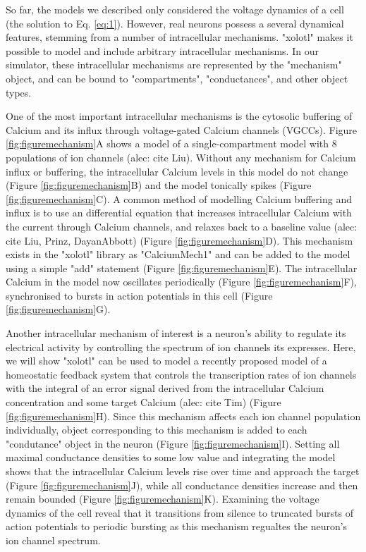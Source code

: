 \documentclass{frontiersSCNS} %
\begin{document}
So far, the models we described only considered the voltage dynamics of a cell (the solution to Eq. \ref{eq:1}). However, real neurons possess a several dynamical features, stemming from a number of intracellular mechanisms. "xolotl" makes it possible to model and include arbitrary intracellular mechanisms. In our simulator, these intracellular mechanisms are represented by the "mechanism" object, and can be bound to "compartments", "conductances", and other object types. 

One of the most important intracellular mechanisms is the cytosolic buffering of Calcium and its influx through voltage-gated Calcium channels (VGCCs). Figure \ref{fig:figuremechanism}A shows a model of a single-compartment model with 8 populations of ion channels (alec: cite Liu). Without any mechanism for Calcium influx or buffering, the intracellular Calcium levels in this model do not change (Figure \ref{fig:figuremechanism}B) and the model tonically spikes (Figure \ref{fig:figuremechanism}C). A common method of modelling Calcium buffering and influx is to use an differential equation that increases intracellular Calcium with the current through Calcium channels, and relaxes back to a baseline value (alec: cite Liu, Prinz, DayanAbbott) (Figure \ref{fig:figuremechanism}D). This mechanism exists in the "xolotl" library as "CalciumMech1" and can be added to the model using a simple "add" statement (Figure \ref{fig:figuremechanism}E). The intracellular Calcium in the model now oscillates periodically (Figure \ref{fig:figuremechanism}F), synchronised to bursts in action potentials in this cell (Figure \ref{fig:figuremechanism}G).

Another intracellular mechanism of interest is a neuron's ability to regulate its electrical activity by controlling the spectrum of ion channels its expresses. Here, we will show "xolotl" can be used to model a recently proposed model of a homeostatic feedback system that controls the transcription rates of ion channels with the integral of an error signal derived from the intracellular Calcium concentration and some target Calcium (alec: cite Tim) (Figure \ref{fig:figuremechanism}H). Since this mechanism affects each ion channel population individually, object corresponding to this mechanism is added to each "condutance" object in the neuron (Figure \ref{fig:figuremechanism}I). Setting all maximal conductance densities to some low value and integrating the model shows that the intracellular Calcium levels rise over time and approach the target (Figure \ref{fig:figuremechanism}J), while all conductance densities increase and then remain bounded (Figure \ref{fig:figuremechanism}K). Examining the voltage dynamics of the cell reveal that it transitions from silence to truncated bursts of action potentials to periodic bursting as this mechanism regualtes the neuron's ion channel spectrum. 
\end{document}
